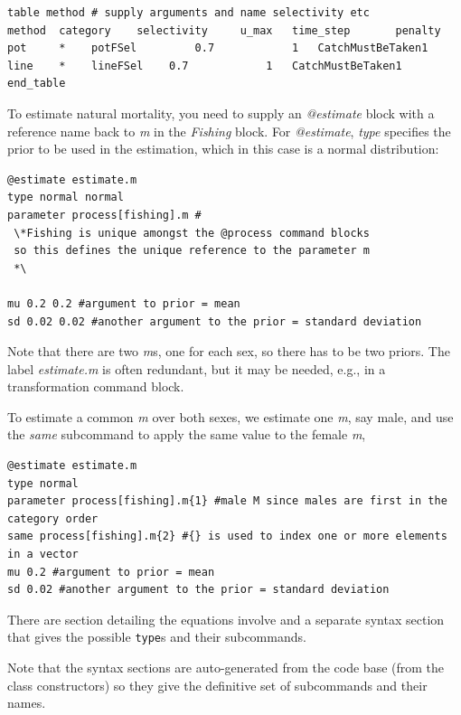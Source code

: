 {\small{\begin{verbatim}
table method # supply arguments and name selectivity etc
method 	category 	selectivity 	u_max 	time_step 		penalty
pot 	* 	 potFSel		 0.7 			1 	CatchMustBeTaken1
line 	* 	 lineFSel 	 0.7 			1 	CatchMustBeTaken1
end_table
\end{verbatim}}}

To estimate natural mortality, you need to supply an \textit{@estimate} block with a reference name back to \textit{m} in the \textit{Fishing} block. For \textit{@estimate}, \textit{type} specifies the prior to be used in the estimation, which in this case is a normal distribution:

{\small{\begin{verbatim}
@estimate estimate.m
type normal normal
parameter process[fishing].m #
 \*Fishing is unique amongst the @process command blocks
 so this defines the unique reference to the parameter m
 *\

mu 0.2 0.2 #argument to prior = mean
sd 0.02 0.02 #another argument to the prior = standard deviation
\end{verbatim}}}

Note that there are two \textit{m}s, one for each sex, so there has to be two priors. The \textit{\@estiamte} label \textit{estimate.m} is often redundant, but it may be needed, e.g., in a transformation command block.

To estimate a common \textit{m} over both sexes, we estimate one \textit{m}, say male, and use the \textit{same} subcommand to apply the same value to the female \textit{m},

{\small{\begin{verbatim}
@estimate estimate.m
type normal 
parameter process[fishing].m{1} #male M since males are first in the category order
same process[fishing].m{2} #{} is used to index one or more elements in a vector
mu 0.2 #argument to prior = mean
sd 0.02 #another argument to the prior = standard deviation
\end{verbatim}}}

There are section detailing the equations involve and a separate syntax section that gives the possible \texttt{type}s and their subcommands.

Note that the syntax sections are auto-generated from the code base (from the class constructors) so they give the definitive set of subcommands and their names. 

\subsection{\label{sec:SingleStepping}}

